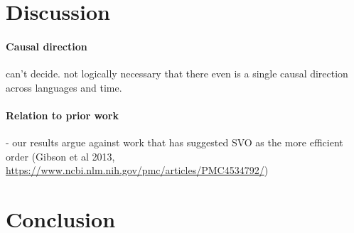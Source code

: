 \documentclass[11pt,a4paper]{article}
\begin{document}
\section{Discussion}

\paragraph{Causal direction} can't decide. not logically necessary that there even is a single causal direction across languages and time.

\paragraph{Relation to prior work}

- our results argue against work that has suggested SVO as the more efficient order (Gibson et al 2013, \url{https://www.ncbi.nlm.nih.gov/pmc/articles/PMC4534792/})


\section{Conclusion}



\end{document}
